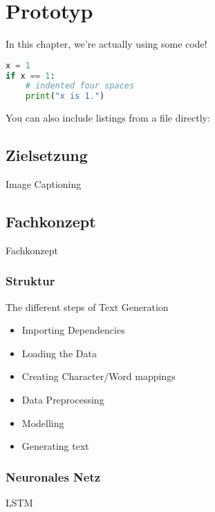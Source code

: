 \chapter{Prototyp}\label{ch:method}

In this chapter, we're actually using some code!

\begin{lstlisting}[language=Python,caption={This is an example of inline listing},captionpos=b]
x = 1
if x == 1:
    # indented four spaces
    print("x is 1.")

\end{lstlisting}

You can also include listings from a file directly:



\section{Zielsetzung}

Image Captioning

\section{Fachkonzept}

Fachkonzept

\subsection{Struktur}

The different steps of Text Generation

\begin{itemize}
\item Importing Dependencies
\item Loading the Data
\item Creating Character/Word mappings
\item Data Preprocessing
\item Modelling
\item Generating text
\end{itemize}

\subsection{Neuronales Netz}\label{ss:nn}

LSTM



